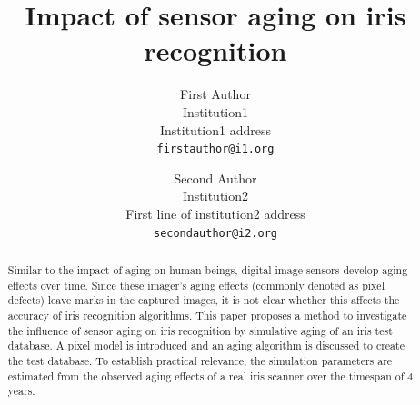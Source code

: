 \documentclass[10pt,twocolumn,letterpaper]{article}
\begin{document}
\title{Impact of sensor aging on iris recognition}

\author{First Author\\
Institution1\\
Institution1 address\\
{\tt\small firstauthor@i1.org}
\and
Second Author\\
Institution2\\
First line of institution2 address\\
{\tt\small secondauthor@i2.org}
}

\maketitle
\thispagestyle{empty}

\begin{abstract}
   Similar to the impact of aging on human beings, digital image sensors develop aging effects over time. Since these imager's aging effects (commonly denoted as pixel defects) leave marks in the captured images, it is not clear whether this affects the accuracy of iris recognition algorithms. This paper proposes a method to investigate the influence of sensor aging on iris recognition by simulative aging of an iris test database. A pixel model is introduced and an aging algorithm is discussed to create the test database. To establish practical relevance, the simulation parameters are estimated from the observed aging effects of a real iris scanner over the timespan of 4 years.
\end{abstract}

\end{document}
